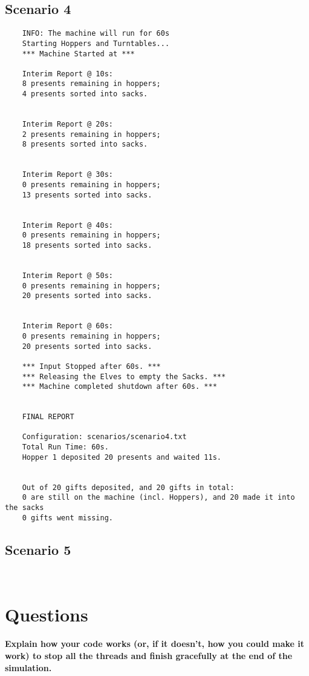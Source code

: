 \documentclass[a4paper,12pt]{article}
\begin{document}
        
    \subsection{Scenario 4}
    \begin{verbatim}
    INFO: The machine will run for 60s
    Starting Hoppers and Turntables...
    *** Machine Started at ***

    Interim Report @ 10s:
    8 presents remaining in hoppers;
    4 presents sorted into sacks.


    Interim Report @ 20s:
    2 presents remaining in hoppers;
    8 presents sorted into sacks.


    Interim Report @ 30s:
    0 presents remaining in hoppers;
    13 presents sorted into sacks.


    Interim Report @ 40s:
    0 presents remaining in hoppers;
    18 presents sorted into sacks.


    Interim Report @ 50s:
    0 presents remaining in hoppers;
    20 presents sorted into sacks.


    Interim Report @ 60s:
    0 presents remaining in hoppers;
    20 presents sorted into sacks.

    *** Input Stopped after 60s. ***
    *** Releasing the Elves to empty the Sacks. ***
    *** Machine completed shutdown after 60s. ***


    FINAL REPORT

    Configuration: scenarios/scenario4.txt
    Total Run Time: 60s.
    Hopper 1 deposited 20 presents and waited 11s.


    Out of 20 gifts deposited, and 20 gifts in total:
    0 are still on the machine (incl. Hoppers), and 20 made it into the sacks
    0 gifts went missing.
    \end{verbatim}


    \subsection{Scenario 5}
    \begin{verbatim}
        
    \end{verbatim}

    \section{Questions}
    \textbf{Explain how your code works (or, if it doesn’t, how you could make it work)
    to stop all the threads and finish gracefully at the end of the simulation.\\}
    
\end{document}
